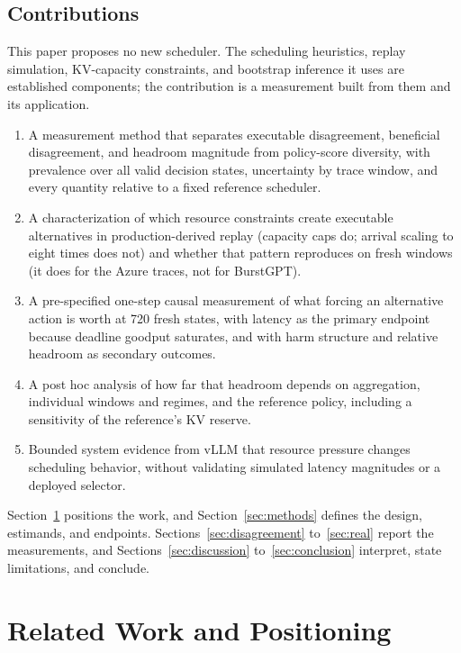 \documentclass[preprint,12pt]{elsarticle}
\begin{document}
\subsection{Contributions}
This paper proposes no new scheduler. The scheduling heuristics, replay
simulation, KV-capacity constraints, and bootstrap inference it uses are
established components; the contribution is a measurement built from them and
its application.
\begin{enumerate}
  \item A measurement method that separates executable disagreement, beneficial
  disagreement, and headroom magnitude from policy-score diversity, with
  prevalence over all valid decision states, uncertainty by trace window, and
  every quantity relative to a fixed reference scheduler.
  \item A characterization of which resource constraints create executable
  alternatives in production-derived replay (capacity caps do; arrival scaling to
  eight times does not) and whether that pattern reproduces on fresh windows (it
  does for the Azure traces, not for BurstGPT).
  \item A pre-specified one-step causal measurement of what forcing an
  alternative action is worth at 720 fresh states, with latency as the primary
  endpoint because deadline goodput saturates, and with harm structure and
  relative headroom as secondary outcomes.
  \item A post hoc analysis of how far that headroom depends on
  aggregation, individual windows and regimes, and the reference policy,
  including a sensitivity of the reference's KV reserve.
  \item Bounded system evidence from vLLM that resource pressure changes
  scheduling behavior, without validating simulated latency magnitudes or a
  deployed selector.
\end{enumerate}

Section~\ref{sec:related} positions the work, and Section~\ref{sec:methods}
defines the design, estimands, and endpoints. Sections~\ref{sec:disagreement}
to~\ref{sec:real} report the measurements, and Sections~\ref{sec:discussion}
to~\ref{sec:conclusion} interpret, state limitations, and conclude.

\section{Related Work and Positioning}
\label{sec:related}
\end{document}

